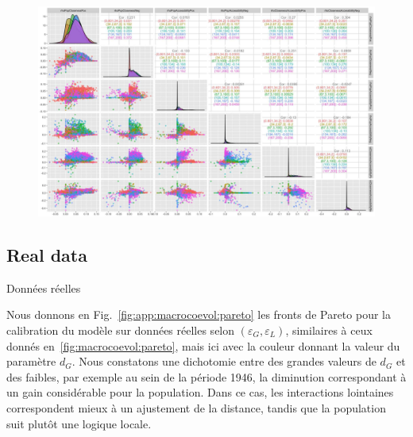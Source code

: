 \begin{figure}
	\includegraphics[width=\linewidth]{Figures/Final/A-macrocoevol-pse.jpg}
\end{figure}








\subsection{Real data}{Données réelles}


Nous donnons en Fig.~\ref{fig:app:macrocoevol:pareto} les fronts de Pareto pour la calibration du modèle sur données réelles selon $(\varepsilon_G,\varepsilon_L)$, similaires à ceux donnés en~\ref{fig:macrocoevol:pareto}, mais ici avec la couleur donnant la valeur du paramètre $d_G$. Nous constatons une dichotomie entre des grandes valeurs de $d_G$ et des faibles, par exemple au sein de la période 1946, la diminution correspondant à un gain considérable pour la population. Dans ce cas, les interactions lointaines correspondent mieux à un ajustement de la distance, tandis que la population suit plutôt une logique locale.


